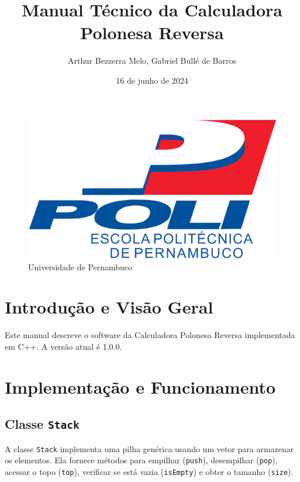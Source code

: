 \documentclass[a4paper,12pt]{article}
\title{Manual Técnico da Calculadora Polonesa Reversa}
\author{Arthur Bezzerra Melo, Gabriel Bullé de Barros}
\date{16 de junho de 2024}
\begin{document}
\maketitle

\begin{figure}[h]
    \centering
    \includegraphics[width=0.5\linewidth]{logo-poli.png}
    \caption{Universidade de Pernambuco}
    \label{fig:logo-poli.png}
\end{figure}

\section{Introdução e Visão Geral}

Este manual descreve o software da Calculadora Polonesa Reversa implementada em C++. A versão atual é 1.0.0.

\section{Implementação e Funcionamento}

\subsection{Classe \texttt{Stack}}
A classe \texttt{Stack} implementa uma pilha genérica usando um vetor para armazenar os elementos. Ela fornece métodos para empilhar (\texttt{push}), desempilhar (\texttt{pop}), acessar o topo (\texttt{top}), verificar se está vazia (\texttt{isEmpty}) e obter o tamanho (\texttt{size}).

\vspace{20pt}
\end{document}
